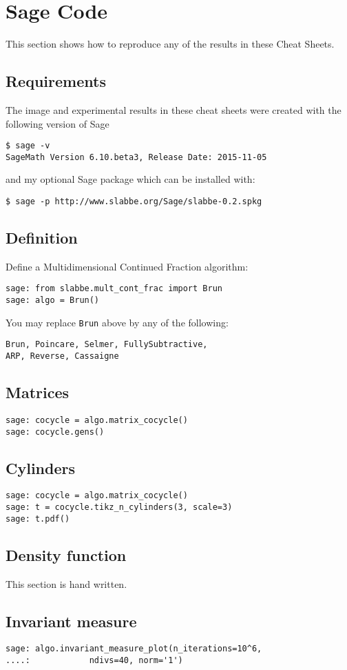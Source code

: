 \section{Sage Code}
This section shows how to reproduce any of the results in these Cheat Sheets.
\subsection{Requirements}
The image and experimental results in these cheat sheets were created with the
following version of Sage \cite{sage}
\begin{verbatim}
$ sage -v
SageMath Version 6.10.beta3, Release Date: 2015-11-05
\end{verbatim}
and my optional Sage package which can be installed with:
\begin{verbatim}
$ sage -p http://www.slabbe.org/Sage/slabbe-0.2.spkg
\end{verbatim}
\subsection{Definition}
Define a Multidimensional Continued Fraction algorithm:
\begin{verbatim}
sage: from slabbe.mult_cont_frac import Brun
sage: algo = Brun()
\end{verbatim}
You may replace \texttt{Brun} above by any of the following:
\begin{verbatim}
Brun, Poincare, Selmer, FullySubtractive, 
ARP, Reverse, Cassaigne
\end{verbatim}
\subsection{Matrices}
\begin{verbatim}
sage: cocycle = algo.matrix_cocycle()
sage: cocycle.gens()
\end{verbatim}
\subsection{Cylinders}
\begin{verbatim}
sage: cocycle = algo.matrix_cocycle()
sage: t = cocycle.tikz_n_cylinders(3, scale=3)
sage: t.pdf()
\end{verbatim}
\subsection{Density function}
This section is hand written.
\subsection{Invariant measure}
\begin{verbatim}
sage: algo.invariant_measure_plot(n_iterations=10^6,
....:            ndivs=40, norm='1')
\end{verbatim}
